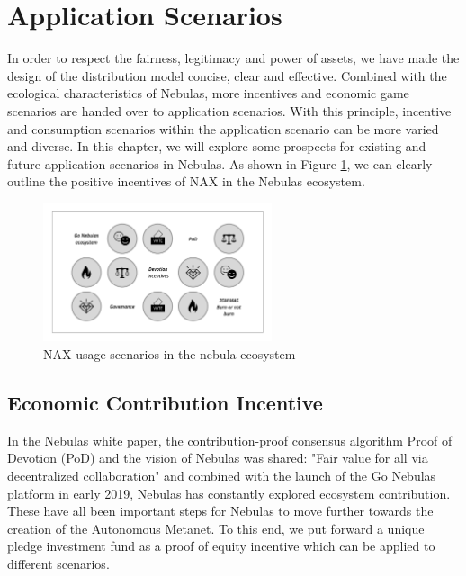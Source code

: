 \section{Application Scenarios}
In order to respect the fairness, legitimacy and power of assets, we have made the design of the distribution model concise, clear and effective. Combined with the ecological characteristics of Nebulas, more incentives and economic game scenarios are handed over to application scenarios. With this principle, incentive and consumption scenarios within the application scenario can be more varied and diverse. In this chapter, we will explore some prospects for existing and future application scenarios in Nebulas. As shown in Figure \ref{fig:nax_ecosys}, we can clearly outline the positive incentives of NAX in the Nebulas ecosystem.

\begin{figure}[h]
  \centering
  \includegraphics[width=0.6\textwidth]{../common/usecases.pdf}
  \caption{NAX usage scenarios in the nebula ecosystem\label{fig:nax_ecosys}}
\end{figure}

\subsection{Economic Contribution Incentive}
In the Nebulas white paper, the contribution-proof consensus algorithm Proof of Devotion (PoD) and the vision of Nebulas was shared: "Fair value for all via decentralized collaboration" and combined with the launch of the Go Nebulas platform in early 2019, Nebulas has constantly explored ecosystem contribution. These have all been important steps for Nebulas to move further towards the creation of the Autonomous Metanet. To this end, we put forward a unique pledge investment fund as a proof of equity incentive which can be applied to different scenarios.

